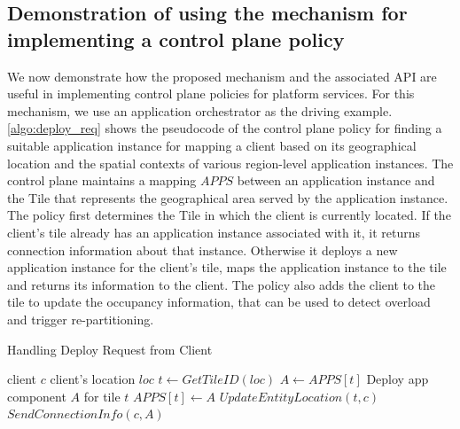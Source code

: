 \subsection{Demonstration of using the mechanism for implementing a control plane policy}
We now demonstrate how the proposed mechanism and the associated API are useful in implementing control plane policies for platform services. For this mechanism, we use an application orchestrator as the driving example. \cref{algo:deploy_req} shows the pseudocode of the control plane policy for finding a suitable application instance for mapping a client based on its geographical location and the spatial contexts of various region-level application instances. The control plane maintains a mapping $APPS$ between an application instance and the Tile that represents the geographical area served by the application instance. The policy first determines the Tile in which the client is currently located. If the client's tile already has an application instance associated with it, it returns connection information about that instance. Otherwise it deploys a new application instance for the client's tile, maps the application instance to the tile and returns its information to the client. The policy also adds the client to the tile to update the occupancy information, that can be used to detect overload and trigger re-partitioning.
\begin{algorithm}
\caption{Handling Deploy Request from Client}
\begin{algorithmic}
\Require client $c$
\Require client's location $loc$
\State $t \gets GetTileID \left( loc \right)$
    \State $A \gets APPS \left[ t \right]$
\Else
    \State Deploy app component $A$ for tile $t$
    \State $APPS  \left[ t \right] \gets A$
\EndIf
\State $UpdateEntityLocation \left(t, c \right)$
\State $SendConnectionInfo \left(c, A \right)$ 
\end{algorithmic}
\label{algo:deploy_req}
\end{algorithm}

